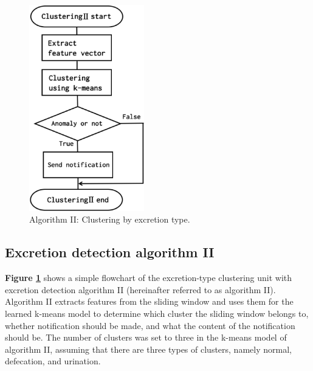 \documentclass[publish,JRM,paper]{jaciiiarticle}
\begin{document}
\begin{figure}[t]
\centering
\includegraphics[width=5cm]{./fig/detection2.eps}
\caption{Algorithm I\hspace{-.1em}I: Clustering by excretion type.}
\label{cluster2}
\end{figure}

\subsection{Excretion detection algorithm I\hspace{-.1em}I}
{\bf Figure \ref{cluster2}} shows a simple flowchart of the excretion-type clustering unit with excretion detection algorithm I\hspace{-.1em}I (hereinafter referred to as algorithm I\hspace{-.1em}I). Algorithm I\hspace{-.1em}I extracts features from the sliding window and uses them for the learned k-means model to determine which cluster the sliding window belongs to, whether notification should be made, and what the content of the notification should be. The number of clusters was set to three in the k-means model of algorithm I\hspace{-.1em}I, assuming that there are three types of clusters, namely normal, defecation, and urination.
\end{document}
